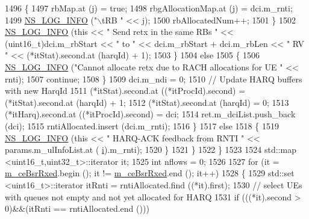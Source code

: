 \begin{DoxyCode}
1496                     \{
1497                       rbMap.at (j) = \textcolor{keyword}{true};
1498                       rbgAllocationMap.at (j) = dci.m\_rnti;
1499                       \hyperlink{group__logging_gafbd73ee2cf9f26b319f49086d8e860fb}{NS\_LOG\_INFO} (\textcolor{stringliteral}{"\(\backslash\)tRB "} << j);
1500                       rbAllocatedNum++;
1501                     \}
1502                   \hyperlink{group__logging_gafbd73ee2cf9f26b319f49086d8e860fb}{NS\_LOG\_INFO} (\textcolor{keyword}{this} << \textcolor{stringliteral}{" Send retx in the same RBs "} << (uint16\_t)dci.m\_rbStart 
      << \textcolor{stringliteral}{" to "} << dci.m\_rbStart + dci.m\_rbLen << \textcolor{stringliteral}{" RV "} << (*itStat).second.at (harqId) + 1);
1503                 \}
1504               \textcolor{keywordflow}{else}
1505                 \{
1506                   \hyperlink{group__logging_gafbd73ee2cf9f26b319f49086d8e860fb}{NS\_LOG\_INFO} (\textcolor{stringliteral}{"Cannot allocate retx due to RACH allocations for UE "} << rnti);
1507                   \textcolor{keywordflow}{continue};
1508                 \}
1509               dci.m\_ndi = 0;
1510               \textcolor{comment}{// Update HARQ buffers with new HarqId}
1511               (*itStat).second.at ((*itProcId).second) = (*itStat).second.at (harqId) + 1;
1512               (*itStat).second.at (harqId) = 0;
1513               (*itHarq).second.at ((*itProcId).second) = dci;
1514               ret.m\_dciList.push\_back (dci);
1515               rntiAllocated.insert (dci.m\_rnti);
1516             \}
1517             \textcolor{keywordflow}{else}
1518             \{
1519               \hyperlink{group__logging_gafbd73ee2cf9f26b319f49086d8e860fb}{NS\_LOG\_INFO} (\textcolor{keyword}{this} << \textcolor{stringliteral}{" HARQ-ACK feedback from RNTI "} << params.m\_ulInfoList.at (
      \hyperlink{bernuolliDistribution_8m_a6f6ccfcf58b31cb6412107d9d5281426}{i}).m\_rnti);
1520             \}
1521         \}
1522     \}
1523 
1524   std::map <uint16\_t,uint32\_t>::iterator it;
1525   \textcolor{keywordtype}{int} nflows = 0;
1526 
1527   \textcolor{keywordflow}{for} (it = \hyperlink{classns3_1_1TtaFfMacScheduler_a6b88fda6059c5679b747c2e1856729b1}{m\_ceBsrRxed}.begin (); it != \hyperlink{classns3_1_1TtaFfMacScheduler_a6b88fda6059c5679b747c2e1856729b1}{m\_ceBsrRxed}.end (); it++)
1528     \{
1529       std::set <uint16\_t>::iterator itRnti = rntiAllocated.find ((*it).first);
1530       \textcolor{comment}{// select UEs with queues not empty and not yet allocated for HARQ}
1531       \textcolor{keywordflow}{if} (((*it).second > 0)&&(itRnti == rntiAllocated.end ()))

\end{DoxyCode}
